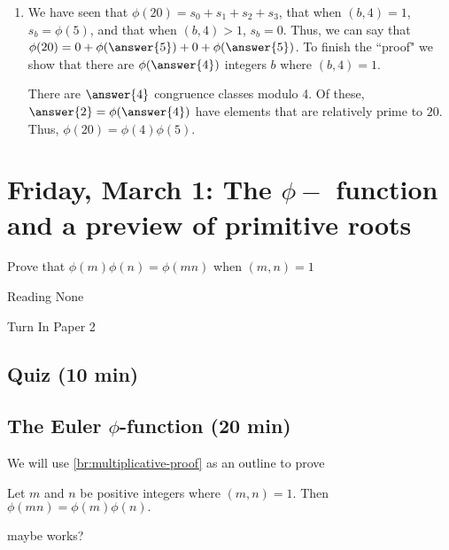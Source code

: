 \documentclass[letterpaper, 11 pt]{ximera}
\begin{document}
\begin{br}
\begin{enumerate}
    \item We have seen that $\phi(20)=s_0+s_1+s_2+s_3$, that when $(b,4)=1$, $s_b=\phi(5)$, and that when $(b,4)>1$, $s_b=0$. Thus, we can say that $\phi(20)=0+\phi(\answer{5})+0+\phi(\answer{5})$. To finish the 	``proof" we show that there are $\phi(\answer{4})$ integers $b$ where $(b,4)=1$. 
 
    \begin{solution}
      There are $\answer{4}$ congruence classes modulo 4. Of these, $\answer{2}=\phi(\answer{4})$ have elements that are relatively prime to $20$. Thus, $\phi(20)=\phi(4)\phi(5)$.
    \end{solution}
  \end{enumerate}
 
\end{br}

\section{Friday, March 1: The $\phi-$ function and a preview of primitive roots}

\begin{obj}
  \item Prove that $\phi(m)\phi(n)=\phi(mn)$ when $(m,n)=1$
\end{obj}


\begin{pre}
    \item[Reading] None
    \item[Turn In] Paper 2
\end{pre}

\subsection{Quiz (10 min)}

\subsection*{The Euler $\phi$-function (20 min)}

We will use \autoref{br:multiplicative-proof} as an outline to prove 

\begin{thm*}[Theorem 3.2]\label{thm:phi-multiplicative}
  Let $m$ and $n$ be positive integers where $(m,n)=1$. Then $\phi(mn)=\phi(m)\phi(n).$
\end{thm*}
maybe works?
\end{document}

